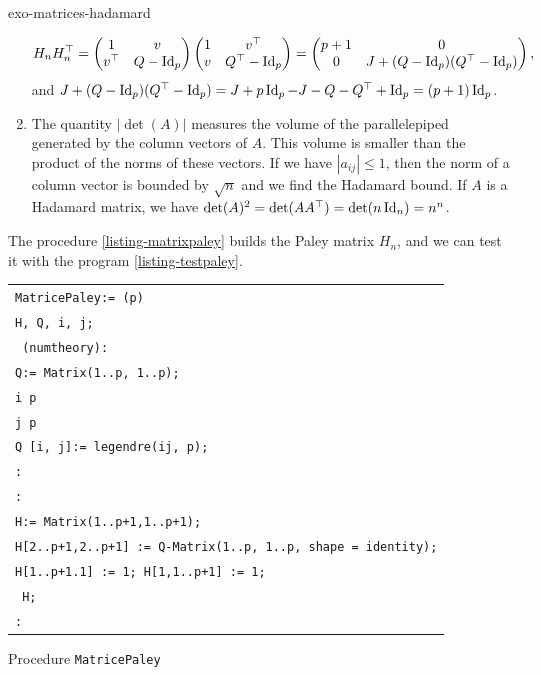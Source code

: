\begin{correction}{exo-matrices-hadamard}
\begin{enumerate}
\begin{equation*}
H_n H_n^\top = \begin{pmatrix} 1 & v \\v^\top & Q- \operatorname{Id}_p \end{pmatrix} \begin{pmatrix} 1 & v^\top \\v & Q^\top - \operatorname{Id}_p \end{pmatrix} = \begin{pmatrix} p+1 & 0 \\0 & J + (Q- \operatorname{Id}_p) (Q^\top - \operatorname{Id}_p) \end{pmatrix},
\end{equation*}
and $ J + (Q- \operatorname{Id}_p) (Q^\top - \operatorname{Id}_p) = J + p \operatorname{Id}_p - J - Q - Q^\top + \operatorname{Id}_p = (p+1) \operatorname{Id}_p $.
\item The quantity $ | \det (A) | $ measures the volume of the parallelepiped generated by the column vectors of $ A $. This volume is smaller than the product of the norms of these vectors. If we have $ | a_{ij} | \leq 1 $, then the norm of a column vector is bounded by $ \sqrt{n} $ and we find the Hadamard bound. If $ A $ is a Hadamard matrix, we have $ \det (A)^2 = \det (A A^\top) = \det (n \operatorname{Id}_n) = n^n $.
\end{enumerate} The procedure \Maple{} \ref{listing-matrixpaley} builds the Paley matrix $ H_n $, and we can test it with the program \ref{listing-testpaley}.

\begin{listing} 
\begin{footnotesize} 
{\upshape
\begin{tabular}{l} \texttt{MatricePaley:= \pproc{} (p)} \\
\texttt{\plocal H, Q, i, j;} \\
\texttt{\pwith{} (numtheory):} \\
\texttt{Q:= Matrix(1..p, 1..p);} \\
\texttt{\pfor i \pfrom 1 \pto p \pdo} \\
\texttt{\pfor j \pfrom 1 \pto p \pdo} \\
\texttt{\quad Q [i, j]:= legendre(ij, p);} \\
\texttt{\pend \pdo{}:} \\
\texttt{\pend \pdo{}:} \\
\texttt{H:= Matrix(1..p+1,1..p+1);} \\
\texttt{H[2..p+1,2..p+1] := Q-Matrix(1..p, 1..p, shape = identity);} \\
\texttt{H[1..p+1.1] := 1; H[1,1..p+1] := 1;} \\
\texttt{\preturn{} H;} \\
\texttt{\pend \pproc{}:} \\
\end{tabular}
}
\end{footnotesize}
\caption{Procedure \texttt{\upshape MatricePaley}}
\label{listing-matrixpaley}
\end{listing}
 

\end{correction}
